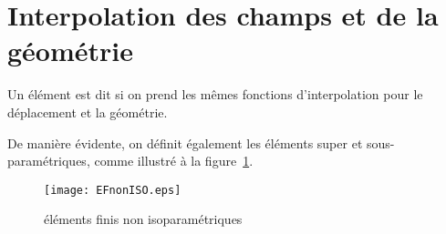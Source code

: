 \medskip
\section{Interpolation des champs et de la géométrie}

Un élément est dit  si on prend les mêmes fonctions
d'interpolation pour le déplacement et la géométrie.

De manière évidente, on définit également les éléments super et sous-paramétriques,
comme illustré à la figure~\ref{EFnonISO}.
\begin{figure}[ht]
\centering
\texttt{[image: EFnonISO.eps]}
\caption{\label{EFnonISO} éléments finis non isoparamétriques}
\end{figure}

